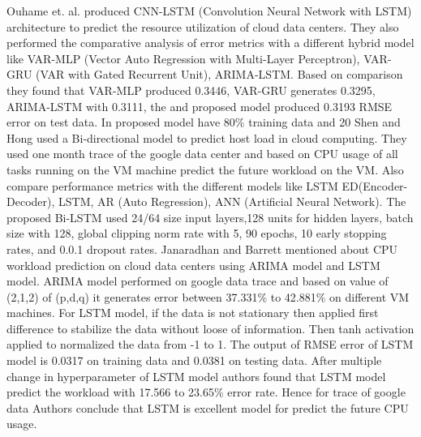Ouhame et. al. \cite{ouhame2021efficient} produced CNN-LSTM (Convolution Neural Network with LSTM) architecture to predict the resource utilization of cloud data centers. They also performed the comparative analysis of error metrics with a different hybrid model like VAR-MLP (Vector Auto Regression with Multi-Layer Perceptron), VAR-GRU (VAR with Gated Recurrent Unit), ARIMA-LSTM.  Based on comparison they found that VAR-MLP produced 0.3446, VAR-GRU generates 0.3295, ARIMA-LSTM with 0.3111, the and proposed model produced 0.3193 RMSE error on test data. In proposed model have 80\% training data and 20%
Shen and Hong \cite{shen2020host} used a Bi-directional model to predict host load in cloud computing. They used one month trace of the google data center \cite{verma2015large} and based on CPU usage of all tasks running on the VM machine predict the future workload on the VM. Also compare performance metrics with the different models like LSTM ED(Encoder-Decoder), LSTM, AR (Auto Regression), ANN (Artificial Neural Network). The proposed Bi-LSTM used 24/64 size input layers,128 units for hidden layers, batch size with 128, global clipping norm rate with 5, 90 epochs, 10 early stopping rates, and 0.0.1 dropout rates.
Janaradhan and Barrett \cite{janardhanan2017cpu} mentioned about CPU workload prediction on cloud data centers using ARIMA model and LSTM model. ARIMA model performed on google data trace and based on value of (2,1,2) of (p,d,q) it generates error between 37.331\% to 42.881\% on different VM machines. For LSTM model, if the data is not stationary then applied first difference to stabilize the data without loose of information. Then tanh activation applied to normalized the data from -1 to 1. The output of RMSE error of LSTM model  is 0.0317 on training data and 0.0381 on testing data. After multiple change in hyperparameter of LSTM model authors found that LSTM model predict the workload with 17.566 to 23.65\% error rate. Hence for trace of  google data Authors conclude that LSTM is excellent model for predict the future CPU usage.




